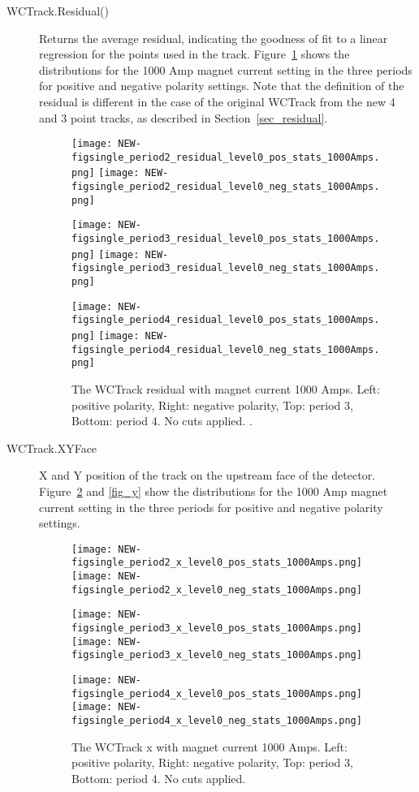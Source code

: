 \begin{description}
 \item[WCTrack.Residual()] {   
   Returns the average residual, indicating the goodness of fit to a linear regression for the points used in the track. Figure~\ref{fig_residual} shows the  distributions for the 1000 Amp magnet current setting in the three periods for positive and negative polarity settings. Note that the definition of the residual is different in the case of the original WCTrack from the new 4 and 3 point tracks, as described in Section~\ref{sec_residual}.
         \begin{figure}[h]
         
            	\texttt{[image: NEW-figsingle\_period2\_residual\_level0\_pos\_stats\_1000Amps.png]}
	 \texttt{[image: NEW-figsingle\_period2\_residual\_level0\_neg\_stats\_1000Amps.png]}
	 
   	\texttt{[image: NEW-figsingle\_period3\_residual\_level0\_pos\_stats\_1000Amps.png]}
	 \texttt{[image: NEW-figsingle\_period3\_residual\_level0\_neg\_stats\_1000Amps.png]}
	 
 	\texttt{[image: NEW-figsingle\_period4\_residual\_level0\_pos\_stats\_1000Amps.png]}
	 \texttt{[image: NEW-figsingle\_period4\_residual\_level0\_neg\_stats\_1000Amps.png]}
   \caption[short]{The WCTrack residual with magnet current 1000 Amps. Left: positive polarity, Right: negative polarity, Top: period 3, Bottom: period 4. No cuts applied. .}
   \label{fig_residual}
  \end{figure}
 }
   
\item[WCTrack.XYFace]{
  X and Y position of the track on the upstream face of the detector. Figure~\ref{fig_x} and  \ref{fig_y} show the distributions for the 1000 Amp magnet current setting in the three periods for positive and negative polarity settings.
      \begin{figure}[h]
         	\texttt{[image: NEW-figsingle\_period2\_x\_level0\_pos\_stats\_1000Amps.png]}
	 \texttt{[image: NEW-figsingle\_period2\_x\_level0\_neg\_stats\_1000Amps.png]}
	 
   	\texttt{[image: NEW-figsingle\_period3\_x\_level0\_pos\_stats\_1000Amps.png]}
	 \texttt{[image: NEW-figsingle\_period3\_x\_level0\_neg\_stats\_1000Amps.png]}
	 
 	\texttt{[image: NEW-figsingle\_period4\_x\_level0\_pos\_stats\_1000Amps.png]}
	 \texttt{[image: NEW-figsingle\_period4\_x\_level0\_neg\_stats\_1000Amps.png]}
   \caption[short]{The WCTrack x with magnet current 1000 Amps. Left: positive polarity, Right: negative polarity, Top: period 3, Bottom: period 4. No cuts applied.}
   \label{fig_x}
  \end{figure}
  
}
\end{description}
